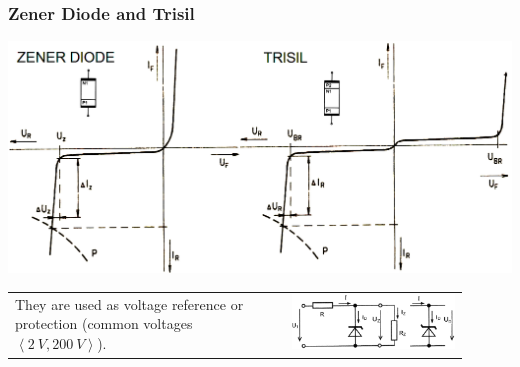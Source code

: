 \documentclass{beamer}
\begin{document}
	\begin{frame}
    \frametitle{Zener Diode and Trisil}
		\begin{center}
			\includegraphics[scale=0.3]{obr06_zenerTrisil.png} 
		\end{center}
		\begin{tabular}{m{0.55\linewidth} m{0.35\linewidth}}
		\small
		They are used as voltage reference or protection (common voltages $\left\langle 2\:V, 200\:V\right\rangle$).
		 &
		\includegraphics[scale=0.05]{obr09_zapojeniZener.png} 
		\end{tabular}
	\end{frame}
\end{document}
